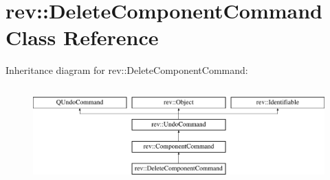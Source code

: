 \hypertarget{classrev_1_1_delete_component_command}{}\section{rev\+::Delete\+Component\+Command Class Reference}
\label{classrev_1_1_delete_component_command}
Inheritance diagram for rev\+::Delete\+Component\+Command\+:\begin{figure}[H]
\begin{center}
\leavevmode
\includegraphics[height=3.752094cm]{classrev_1_1_delete_component_command}
\end{center}
\end{figure}
